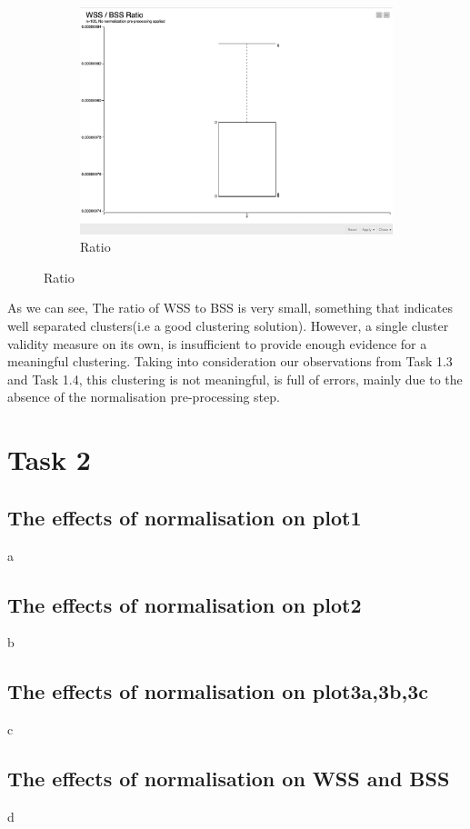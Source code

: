 \documentclass[11pt]{article}
\begin{document}
\begin{figure}[H]
\begin{subfigure}{0.4\textwidth}
							\includegraphics[width=\textwidth]{res/task-1/WSS-BSS-Ratio}
		 					\caption{Ratio}
		 					\label{fig:third}
		 				\end{subfigure}
		 				\label{fig:figures}	
		 			\end{figure}
	 				\fi
	 				As we can see, The ratio of WSS to BSS is very small, something that indicates well separated clusters(i.e a good clustering solution). However, a single cluster validity measure on its own, is insufficient to provide enough evidence for a meaningful clustering. Taking into consideration our observations from Task 1.3 and Task 1.4, this clustering \cite{???}is not meaningful, is full of
	 				errors, mainly due to the absence of the normalisation pre-processing step.
	\section{Task 2}
		\subsection{The effects of normalisation on plot1}
			a
		\subsection{The effects of normalisation on plot2}
			b
		\subsection{The effects of normalisation on plot3a,3b,3c}
			c	
		\subsection{The effects of normalisation on WSS and BSS}
			d
		
\end{document}
